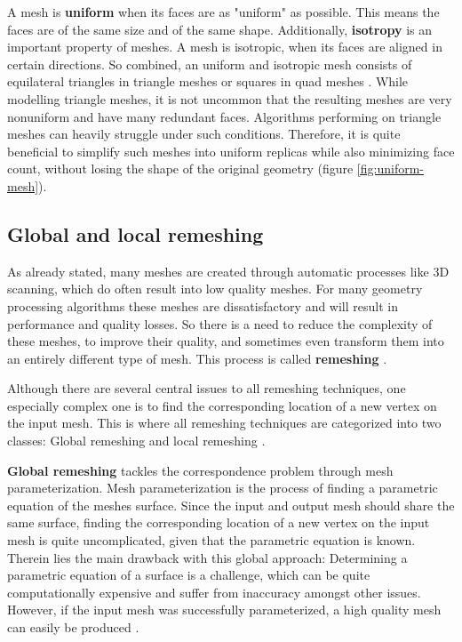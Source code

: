 \documentclass{ACGSeminar}
\begin{document}
A mesh is \textbf{uniform} when its faces are as "uniform" as possible. This means the faces are of the same size and of the same shape. Additionally, \textbf{isotropy} is an important property of meshes. A mesh is isotropic, when its faces are aligned in certain directions. So combined, an uniform and isotropic mesh consists of equilateral triangles in triangle meshes or squares in quad meshes \cite{alliez2003isotropic,surazhsky2003isotropic}. While modelling triangle meshes, it is not uncommon that the resulting meshes are very nonuniform and have many redundant faces. Algorithms performing on triangle meshes can heavily struggle under such conditions. Therefore, it is quite beneficial to simplify such meshes into uniform replicas while also minimizing face count, without losing the shape of the original geometry (figure \ref{fig:uniform-mesh}).


\subsection{Global and local remeshing}\label{global-local-remeshing}
As already stated, many meshes are created through automatic processes like 3D scanning, which do often result into low quality meshes. For many geometry processing algorithms these meshes are dissatisfactory and will result in performance and quality losses. So there is a need to reduce the complexity of these meshes, to improve their quality, and sometimes even transform them into an entirely different type of mesh. This process is called \textbf{remeshing} \cite{alliez2008recent}.\bigskip

Although there are several central issues to all remeshing techniques, one especially complex one is to find the corresponding location of a new vertex on the input mesh. This is where all remeshing techniques are categorized into two classes: Global remeshing and local remeshing \cite{botsch2007geometric,alliez2008recent}.\bigskip

\textbf{Global remeshing} tackles the correspondence problem through mesh parameterization. Mesh parameterization is the process of finding a parametric equation of the meshes surface. Since the input and output mesh should share the same surface, finding the corresponding location of a new vertex on the input mesh is quite uncomplicated, given that the parametric equation is known. Therein lies the main drawback with this global approach: Determining a parametric equation of a surface is a challenge, which can be quite computationally expensive and suffer from inaccuracy amongst other issues. However, if the input mesh was successfully parameterized, a high quality mesh can easily be produced \cite{jakob2015instant,alliez2008recent}.
\end{document}
